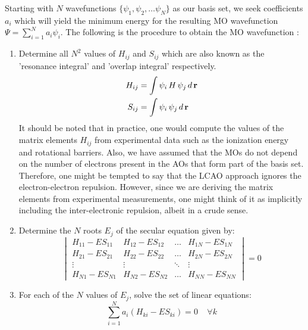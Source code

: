             Starting with $N$ wavefunctions $\{\psi_1, \psi_2, \ldots \psi_N\}$ as our basis set, we seek coefficients $a_{i}$ which will yield the minimum energy for the resulting MO wavefunction $\Psi = \displaystyle\sum_{i=1}^N a_{i} \psi_i$. The following is the procedure to obtain the MO wavefunction :
            \begin{enumerate}
                \item Determine all $N^2$ values of $H_{ij}$ and $S_{ij}$ which are also known as the 'resonance integral' and 'overlap integral' respectively.
                    \begin{equation}\label{eq:resonance and overlap}
                        \begin{aligned}
                            H_{ij} &= \displaystyle\int \psi_i\, H \,\psi_j\, d\,{\mathbf {r}}\\
                            S_{ij} &= \displaystyle\int \psi_i\, \psi_j\, d\,{\mathbf {r}}
                        \end{aligned}
                    \end{equation}
                    It should be noted that in practice, one would compute the values of the matrix elements $H_{ij}$ from experimental data such as the ionization energy and rotational barriers. Also, we have assumed that the MOs do not depend on the number of electrons present in the AOs that form part of the basis set. Therefore, one might be tempted to say that the LCAO approach ignores the electron-electron repulsion. However, since we are deriving the matrix elements from experimental measurements, one might think of it as implicitly including the inter-electronic repulsion, albeit in a crude sense.
                \item Determine the $N$ roots $E_j$ of the secular equation given by:
                    \begin{equation}\label{eq:secular}
                        \begin{vmatrix}
                            H_{11} - E S_{11} & H_{12} - E S_{12} & \ldots & H_{1N} - E S_{1N}\\
                            H_{21} - E S_{21} & H_{22} - E S_{22} & \ldots & H_{2N} - E S_{2N}\\
                            \vdots & \vdots & \ddots & \vdots\\
                            H_{N1} - E S_{N1} & H_{N2} - E S_{N2} & \ldots & H_{NN} - E S_{NN}
                        \end{vmatrix}
                        = 0
                    \end{equation}
                \item For each of the $N$ values of $E_j$, solve the set of linear equations:
                    \begin{equation}\label{eq:linear}
                        \displaystyle\sum_{i=1}^N a_i (H_{ki} - E S_{ki}) = 0 \:\:\:\:\: \forall k
                    \end{equation}
            \end{enumerate}
